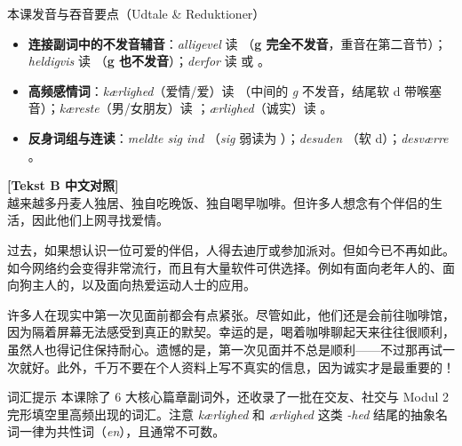 \begin{tipbox}{本课发音与吞音要点（Udtale \& Reduktioner）}
\begin{itemize}
  \item \textbf{连接副词中的不发音辅音}：\textit{alligevel} 读 （\textbf{g 完全不发音}，重音在第二音节）；\textit{heldigvis} 读 （\textbf{g 也不发音}）；\textit{derfor} 读  或 。
  \item \textbf{高频感情词}：\textit{kærlighed}（爱情/爱）读 （中间的 \textit{g} 不发音，结尾软 d 带喉塞音）；\textit{kæreste}（男/女朋友）读 ；\textit{ærlighed}（诚实）读 。
  \item \textbf{反身词组与连读}：\textit{meldte sig ind} （\textit{sig} 弱读为 ）；\textit{desuden} （软 d）；\textit{desværre} 。
\end{itemize}
\end{tipbox}

\begin{transbox}
\small
\textbf{\color{NCDTeal}[Tekst B 中文对照]}\\
越来越多丹麦人独居、独自吃晚饭、独自喝早咖啡。但许多人想念有个伴侣的生活，因此他们上网寻找爱情。

过去，如果想认识一位可爱的伴侣，人得去迪厅或参加派对。但如今已不再如此。如今网络约会变得非常流行，而且有大量软件可供选择。例如有面向老年人的、面向狗主人的，以及面向热爱运动人士的应用。

许多人在现实中第一次见面前都会有点紧张。尽管如此，他们还是会前往咖啡馆，因为隔着屏幕无法感受到真正的默契。幸运的是，喝着咖啡聊起天来往往很顺利，虽然人也得记住保持耐心。遗憾的是，第一次见面并不总是顺利——不过那再试一次就好。此外，千万不要在个人资料上写不真实的信息，因为诚实才是最重要的！
\end{transbox}


\begin{tipbox}{词汇提示}
本课除了 6 大核心篇章副词外，还收录了一批在交友、社交与 Modul 2 完形填空里高频出现的词汇。注意 \textit{kærlighed} 和 \textit{ærlighed} 这类 \textit{-hed} 结尾的抽象名词一律为共性词（\textit{en}），且通常不可数。
\end{tipbox}

